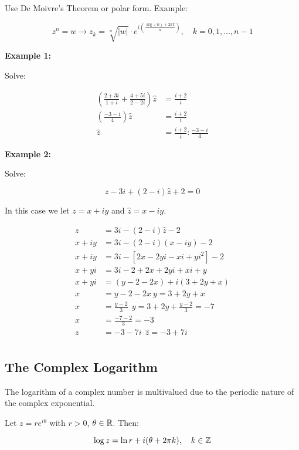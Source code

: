  Use De Moivre’s Theorem or polar form. Example:
	      
\[
	z^n = w \to z_k = \sqrt[n]{|w|} \cdot e^{i\left( \frac{\arg(w) + 2k\pi}{n} \right)}, \quad k = 0, 1, 
	\dots, n-1
\]

\textbf{Example 1:}
\vspace{\baselineskip}

Solve:

\begin{align*}
	\left( \frac{2 + 3i}{1 + i} + \frac{4 + 5i}{2 - 2i}\right) \hat{z} &= \frac{i + 2}{i}\\
	\left( \frac{-3 -i}{4} \right) \hat{z} &= \frac{i + 2}{i}\\
	\hat{z} &= \frac{i + 2}{i} : \frac{-3 -i}{4}
\end{align*}

\textbf{Example 2:}
\vspace{\baselineskip}

Solve:

\[
	z - 3i + (2 -i)\hat{z} + 2 = 0
\]

In this case we let \( z = x + iy \) and \( \hat{z} = x - iy \).

\begin{align*}
	z &= 3i - (2 - i)\hat{z} - 2\\
	x + iy &= 3i - (2 - i)(x - iy) - 2\\
	x + iy &= 3i - [2x - 2yi -xi +yi^2] - 2\\
	x + yi &= 3i - 2 + 2x + 2yi + xi + y\\
	x + yi &= (y - 2 -2x) + i(3 + 2y + x)\\
	x &= y - 2 -2x\ y = 3 + 2y + x\\
	x &= \frac{y - 2}{3}\ \ y = 3 + 2y + \frac{y-2}{3} = -7\\
	x &= \frac{-7 -2}{3} = -3\\
	z &= -3 -7i\ \ \hat{z} = -3 + 7i\\
\end{align*}

\subsection{The Complex Logarithm}

The logarithm of a complex number is multivalued due to the periodic nature of the complex exponential.

Let \( z = re^{i\theta} \) with \( r > 0 \), \( \theta \in \mathbb{R} \). Then:

\[
	\log z = \ln r + i(\theta + 2\pi k), \quad k \in \mathbb{Z}
\]

